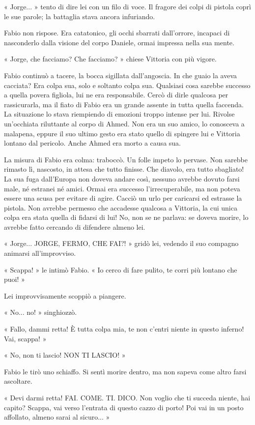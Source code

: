 « Jorge... » tento di dire lei con un filo di voce. Il fragore dei colpi di pistola coprì le sue parole; la battaglia stava ancora infuriando.

Fabio non rispose. Era catatonico, gli occhi sbarrati dall'orrore, incapaci di nasconderlo dalla visione del corpo Daniele, ormai impressa nella sua mente.

« Jorge, che facciamo? Che facciamo? » chiese Vittoria con più vigore.

Fabio continuò a tacere, la bocca sigillata dall'angoscia. In che guaio la aveva cacciata? Era colpa sua, solo e soltanto colpa sua. Qualsiasi cosa sarebbe successo a quella povera figliola, lui ne era responsabile. Cercò di dirle qualcosa per rassicurarla, ma il fiato di Fabio era un grande assente in tutta quella faccenda. La situazione lo stava riempiendo di emozioni troppo intense per lui. Rivolse un'occhiata riluttante al corpo di Ahmed. Non era un suo amico, lo conosceva a malapena, eppure il suo ultimo gesto era stato quello di spingere lui e Vittoria lontano dal pericolo. Anche Ahmed era morto a causa sua.

La misura di Fabio era colma: traboccò. Un folle impeto lo pervase. Non sarebbe rimasto lì, nascosto, in attesa che tutto finisse. Che diavolo, era tutto sbagliato! La sua fuga dall'Europa non doveva andare così, nessuno avrebbe dovuto farsi male, né estranei né amici. Ormai era successo l'irrecuperabile, ma non poteva essere una scusa per evitare di agire. Cacciò un urlo per caricarsi ed estrasse la pistola. Non avrebbe permesso che accadesse qualcosa a Vittoria, la cui unica colpa era stata quella di fidarsi di lui! No, non se ne parlava: se doveva morire, lo avrebbe fatto cercando di difendere almeno lei.

« Jorge... JORGE, FERMO, CHE FAI?! » gridò lei, vedendo il suo compagno animarsi all'improvviso.

« Scappa! » le intimò Fabio. « Io cerco di fare pulito, te corri più lontano che puoi! »

Lei improvvisamente scoppiò a piangere.

« No... no! » singhiozzò.

« Fallo, dammi retta! È tutta colpa mia, te non c'entri niente in questo inferno! Vai, scappa! »

« No, non ti lascio! NON TI LASCIO! »

Fabio le tirò uno schiaffo. Si sentì morire dentro, ma non sapeva come altro farsi ascoltare.

« Devi darmi retta! FAI. COME. TI. DICO. Non voglio che ti succeda niente, hai capito? Scappa, vai verso l'entrata di questo cazzo di porto! Poi vai in un posto affollato, almeno sarai al sicuro... »

